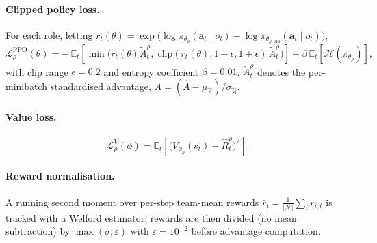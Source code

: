 \documentclass[11pt,a4paper]{article}
\begin{document}
\paragraph{Clipped policy loss.}
For each role, letting
$r_t(\theta)=\exp\!\big(\log\pi_{\theta_\rho}(\bm{a}_t\mid o_t)-\log\pi_{\theta_{\rho,\text{old}}}(\bm{a}_t\mid o_t)\big)$,
\begin{equation}
\mathcal{L}^{\text{PPO}}_\rho(\theta)
= -\,\mathbb{E}_t\!\left[\min\!\big(r_t(\theta)\tilde{A}_t^\rho,\;
    \mathrm{clip}(r_t(\theta),1\!-\!\epsilon,1\!+\!\epsilon)\,\tilde{A}_t^\rho\big)\right]
- \beta\,\mathbb{E}_t[\mathcal{H}(\pi_{\theta_\rho})],
\end{equation}
with clip range $\epsilon=0.2$ and entropy coefficient $\beta=0.01$.
$\tilde{A}_t^\rho$ denotes the per-minibatch standardised advantage,
$\tilde{A}=(\hat{A}-\mu_{\hat A})/\sigma_{\hat A}$.

\paragraph{Value loss.}
\begin{equation}
\mathcal{L}^{V}_\rho(\phi)=\mathbb{E}_t\!\left[\big(V_{\phi_\rho}(s_t)-\hat{R}_t^\rho\big)^{2}\right].
\end{equation}

\paragraph{Reward normalisation.}
A running second moment over per-step team-mean rewards $\bar r_t=\tfrac{1}{|\mathcal N|}\sum_i r_{i,t}$
is tracked with a Welford estimator; rewards are then divided (no mean
subtraction) by $\max(\sigma,\varepsilon)$ with $\varepsilon=10^{-2}$
before advantage computation.
\end{document}
